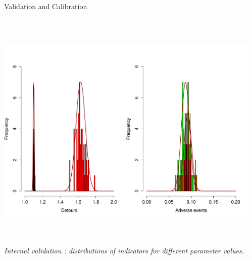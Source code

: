 \documentclass{beamer}
\begin{document}
\begin{frame}{}
\begin{columns}[t]
\begin{column}{.49\textwidth}
\begin{block}{Validation and Calibration}
\begin{columns}[t]
\begin{column}{.95\textwidth}
\begin{justify}
         \end{justify}
    
    \vspace{-1cm}
       
        \begin{columns}[t]
        \begin{column}{.47\textwidth}
                    
          \includegraphics[width=0.9\columnwidth,height=11cm]{figures/histogram}\\
  \begin{justify}
          \textit{\small Internal validation : distributions of indicators for different parameter values.}
 \end{justify}

          \end{column}
          \begin{column}{.47\textwidth}
         

\end{column}
\end{columns}
\end{column}
\end{columns}
\end{block}
\end{column}
\end{columns}
\end{frame}
\end{document}
